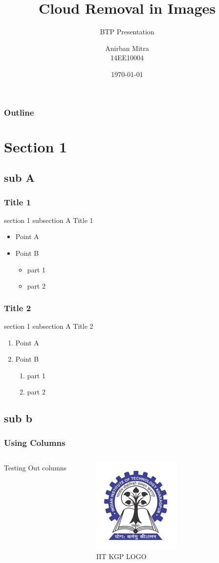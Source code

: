 \documentclass{beamer}
\title{Cloud Removal in Images}
\subtitle{BTP Presentation}
\author{Anirban Mitra \\ 14EE10004}
\institute{IIT Kharagpur}
\date{\today}
\begin{document}
	\begin{frame}
		\titlepage
	\end{frame}
	\begin{frame}
		\frametitle{Outline}
		\tableofcontents
	\end{frame}
	\section{Section 1}
	\subsection{sub A}
	\begin{frame}
		\frametitle{Title 1}
		section 1 subsection A Title 1
		\begin{itemize}
			\item Point A
			\item Point B
			\begin{itemize}
				\item part 1
				\item part 2
			\end{itemize}
		\end{itemize}
	\end{frame}
	\begin{frame}
		\frametitle{Title 2}
		section 1 subsection A Title 2
		\begin{enumerate}[I]
			\item Point A
			\item Point B
			\begin{enumerate}[i]
				\item part 1
				\item part 2
			\end{enumerate}
		\end{enumerate}
	\end{frame}
	\subsection{sub b}
	\begin{frame}
		\frametitle{Using Columns}
		\begin{columns}
			\column{0.5\textwidth}
			Testing Out columns
			\column{0.5\textwidth}
			\centering
			\begin{figure}
				\includegraphics[scale=0.8]{images/kgplogo}
				\caption{IIT KGP LOGO}
			\end{figure}
		\end{columns}
	\end{frame}
\end{document}
